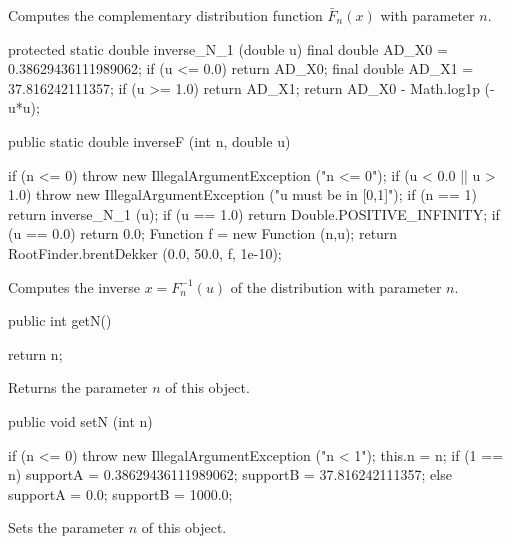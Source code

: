 \begin{tabb}
  Computes the complementary  distribution function  $\bar F_n(x)$ 
  with parameter $n$.
\end{tabb}
\begin{code}\begin{hide}
   protected static double inverse_N_1 (double u)
   {
      final double AD_X0 = 0.38629436111989062;
      if (u <= 0.0)
         return AD_X0;
      final double AD_X1 = 37.816242111357;
      if (u >= 1.0)
         return AD_X1;
      return AD_X0 - Math.log1p (-u*u);
   }\end{hide}

   public static double inverseF (int n, double u)\begin{hide} {
      if (n <= 0)
         throw new IllegalArgumentException ("n <= 0");
      if (u < 0.0 || u > 1.0)
         throw new IllegalArgumentException ("u must be in [0,1]");
      if (n == 1)
         return inverse_N_1 (u);
      if (u == 1.0)
         return Double.POSITIVE_INFINITY;
      if (u == 0.0)
         return 0.0;
      Function f = new Function (n,u);
      return RootFinder.brentDekker (0.0, 50.0, f, 1e-10);
   }\end{hide}
\end{code}
\begin{tabb}
  Computes the inverse $x = F_n^{-1}(u)$ of the
  \ad{} distribution with parameter $n$.
\end{tabb}
\begin{code}

   public int getN()\begin{hide} {
      return n;
   }\end{hide}
\end{code}
 \begin{tabb} Returns the parameter $n$ of this object.
 \end{tabb}
\begin{code}

   public void setN (int n)\begin{hide} {
      if (n <= 0)
         throw new IllegalArgumentException ("n < 1");
      this.n = n;
      if (1 == n) {
         supportA = 0.38629436111989062;
         supportB = 37.816242111357;
      } else {
         supportA = 0.0;
         supportB = 1000.0;
      }
   }\end{hide}
\end{code}
 \begin{tabb} Sets the parameter $n$ of this object.
 \end{tabb}
